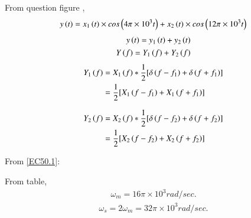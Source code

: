 \documentclass[journal,12pt,twocolumn]{IEEEtran}
\theoremstyle{remark}
\begin{document}
 From question figure ,
\begin{align}
y\left(t\right)=x_1\left(t\right)\times cos\left(4\pi\times10^3t\right)+x_2\left(t\right)\times cos\left(12\pi\times10^3t\right)
\end{align}
\begin{align}
	y\brak{t}=y_1\brak{t}+y_2\brak{t}\\
	Y\brak{f}=Y_1\brak{f}+Y_2\brak{f}\label{EC50.1}
\end{align}
\begin{align}
	Y_1\left(f\right)&=X_1\left(f\right)*\frac{1}{2}[\delta\left(f-f_1\right)+\delta\left(f+f_1\right)]\\
	      &=\frac{1}{2}[X_1\left(f-f_1\right)+X_1\left(f+f_1\right)]
\end{align}
\begin{figure}[ht]
    \centering
	
    
	
    \label{fig:EC50.4}
\end{figure} 

\begin{align}
	Y_2\left(f\right)&=X_2\left(f\right)*\frac{1}{2}[\delta\left(f-f_2\right)+\delta\left(f+f_2\right)]\\ 
	&=\frac{1}{2}[X_2\left(f-f_2\right)+X_2\left(f+f_2\right)]
\end{align}
\clearpage

\begin{figure}[ht]
    \centering
	
    
	
    \label{fig:EC50.5}
\end{figure} 

From \eqref{EC50.1}:
\begin{figure}[ht]
    \centering
	
    
	
    \label{fig:EC50.6}
\end{figure} 

From table,
\begin{align}
\omega_{m}=16\pi\times10^3 rad/sec.
\end{align}
\begin{align}
\omega_{s}=2\omega_{m}=32\pi\times10^3 rad/sec.
\end{align}
\end{document}
